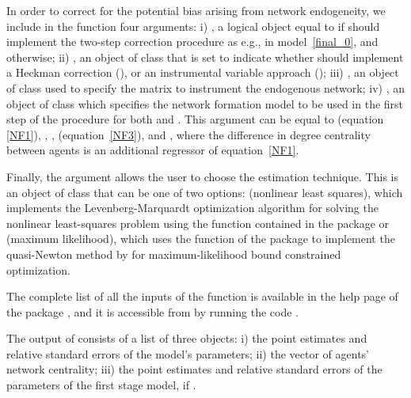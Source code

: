\documentclass[nojss]{jss}
\begin{document}
In order to correct for the potential bias arising from network endogeneity, we include in the function four arguments: i) , a logical object equal to  if  should implement the two-step correction procedure as e.g., in model~\ref{final_0}, and 
otherwise; ii) , an object of class  that is set to indicate whether  should implement a Heckman correction (), or an instrumental variable approach (); iii) ,
an object of class  used to specify the matrix to instrument the endogenous network; iv) , an object of class  which specifies the network formation model to be used in the first step of the procedure for both  and . This argument can be equal to  (equation~
\ref{NF1}),  \cite[equation~\ref{NF2}, as in][]{Fafchamps+Leij+Goyal:2010},  
\cite[equation~\ref{NF2}, as in][]{Graham:2015},  (equation~\ref{NF3}), and , where the difference in degree centrality between agents is an additional regressor of equation~\ref{NF1}.

Finally, the argument  allows the user to choose the estimation technique. This is an object of class  that can be one of two options:  (nonlinear least squares), which implements the Levenberg-Marquardt optimization algorithm for solving the nonlinear least-squares problem using the function  contained in the  package  \citep{minpack.lm} or  (maximum likelihood), which uses the function  of the  package  to implement the quasi-Newton method by \cite{bbmle} for maximum-likelihood bound constrained optimization.

The complete list of all the inputs of the function  is available in the help page of the package , and it is accessible from  by running the code .

The output of  consists of a list of three objects: i) the point estimates and relative standard errors of the model's parameters; ii) the vector of agents' network centrality; iii) the point estimates and relative standard errors of the parameters of the first stage model, if .
\end{document}
